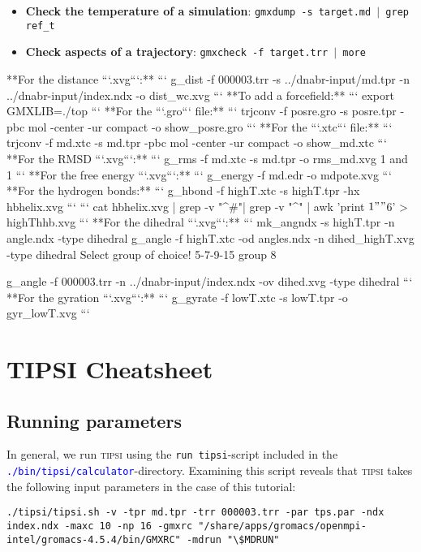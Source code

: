 \documentclass[]{article}
\begin{document}
\begin{itemize}
\item \textbf{Check the temperature of a simulation}: \texttt{gmxdump -s target.md $|$ grep ref\_t}
\item \textbf{Check aspects of a trajectory}: \texttt{gmxcheck -f target.trr $|$ more}
\end{itemize}

**For the distance ```.xvg```:**
```
g_dist -f 000003.trr -s ../dnabr-input/md.tpr -n ../dnabr-input/index.ndx -o dist_wc.xvg
```
**To add a forcefield:**
```
export GMXLIB=./top
```
**For the ```.gro``` file:**
```
trjconv -f posre.gro -s posre.tpr -pbc mol -center -ur compact -o show_posre.gro
```
**For the ```.xtc``` file:**
```
trjconv -f md.xtc -s md.tpr -pbc mol -center -ur compact -o show_md.xtc
```
**For the RMSD ```.xvg```:**
```
g_rms -f md.xtc -s md.tpr -o rms_md.xvg
1 and 1
```
**For the free energy ```.xvg```:**
```
g_energy -f md.edr -o mdpote.xvg
```
**For the hydrogen bonds:**
```
g_hbond -f highT.xtc -s highT.tpr -hx hbhelix.xvg
```
```
cat hbhelix.xvg | grep -v "^\#"| grep -v "^\@" | awk '{print $1"  "$6}' > highThhb.xvg
```
**For the dihedral ```.xvg```:**
```
mk_angndx -s highT.tpr -n angle.ndx -type dihedral
g_angle -f highT.xtc -od angles.ndx -n dihed_highT.xvg -type dihedral
Select group of choice! 5-7-9-15 group 8

g_angle -f 000003.trr -n ../dnabr-input/index.ndx -ov dihed.xvg -type dihedral
```
**For the gyration ```.xvg```:**
```
g_gyrate -f lowT.xtc -s lowT.tpr -o gyr_lowT.xvg
```


\newpage
\section*{TIPSI Cheatsheet}

\subsection*{Running parameters}

In general, we run \textsc{tipsi} using the \texttt{run tipsi}-script included in the \textcolor{blue}{\texttt{./bin/tipsi/calculator}}-directory. 
Examining this script reveals that \textsc{tipsi} takes the following input parameters in the case of this tutorial:

\begin{lstlisting}
./tipsi/tipsi.sh -v -tpr md.tpr -trr 000003.trr -par tps.par -ndx index.ndx -maxc 10 -np 16 -gmxrc "/share/apps/gromacs/openmpi-intel/gromacs-4.5.4/bin/GMXRC" -mdrun "\$MDRUN"
\end{lstlisting}
\end{document}
